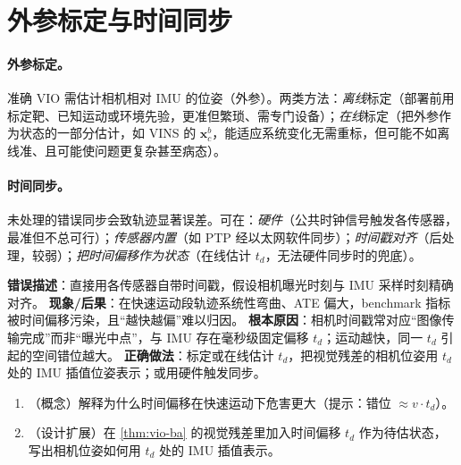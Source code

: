 \section{外参标定与时间同步}
\label{sec:vio-calib}

\paragraph{外参标定。}
准确 VIO 需估计相机相对 IMU 的位姿（外参）\cite{carlone2026handbook}。两类方法：\emph{离线}标定（部署前用标定靶、已知运动或环境先验，更准但繁琐、需专门设备）；\emph{在线}标定（把外参作为状态的一部分估计，如 VINS 的 $\mathbf{x}^b_c$，能适应系统变化无需重标，但可能不如离线准、且可能使问题更复杂甚至病态）。

\paragraph{时间同步。}
未处理的错误同步会致轨迹显著误差。可在：\emph{硬件}（公共时钟信号触发各传感器，最准但不总可行）；\emph{传感器内置}（如 PTP 经以太网软件同步）；\emph{时间戳对齐}（后处理，较弱）；\emph{把时间偏移作为状态}（在线估计 $t_d$，无法硬件同步时的兜底）\cite{carlone2026handbook}。

\begin{pitfall}
\textbf{错误描述}：直接用各传感器自带时间戳，假设相机曝光时刻与 IMU 采样时刻精确对齐。
\textbf{现象/后果}：在快速运动段轨迹系统性弯曲、ATE 偏大，benchmark 指标被时间偏移污染，且“越快越偏”难以归因。
\textbf{根本原因}：相机时间戳常对应“图像传输完成”而非“曝光中点”，与 IMU 存在毫秒级固定偏移 $t_d$；运动越快，同一 $t_d$ 引起的空间错位越大。
\textbf{正确做法}：标定或在线估计 $t_d$，把视觉残差的相机位姿用 $t_d$ 处的 IMU 插值位姿表示；或用硬件触发同步。
\end{pitfall}

\begin{practice}
\begin{enumerate}
  \item （概念）解释为什么时间偏移在快速运动下危害更大（提示：错位 $\approx v\cdot t_d$）。
  \item （设计扩展）在 \cref{thm:vio-ba} 的视觉残差里加入时间偏移 $t_d$ 作为待估状态，写出相机位姿如何用 $t_d$ 处的 IMU 插值表示。
\end{enumerate}
\end{practice}

